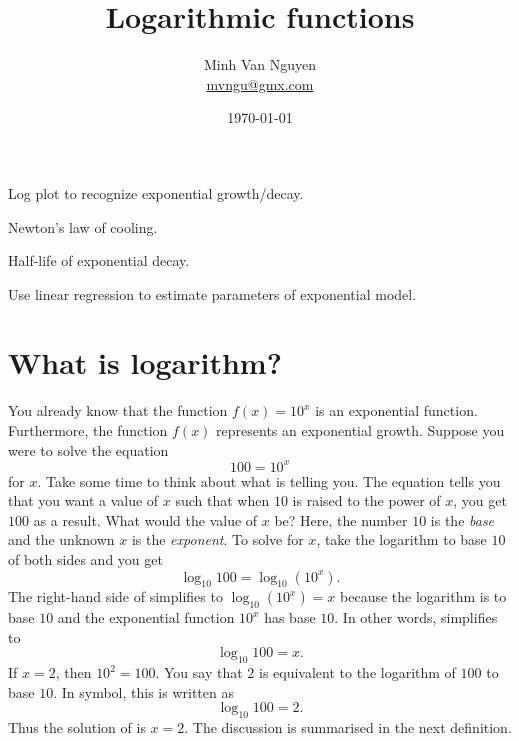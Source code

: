 \documentclass[a4paper,oneside,12pt]{article}
\begin{document}
\title{\Large\bf Logarithmic functions}
\author{%
  Minh Van Nguyen \\
  \url{mvngu@gmx.com}
}
\date{\today}
\maketitle

{\color{red}
\begin{packeditem}
\item Log plot to recognize exponential growth/decay.

\item Newton's law of cooling.

\item Half-life of exponential decay.

\item Use linear regression to estimate parameters of exponential
  model.
\end{packeditem}
}



\section{What is logarithm?}

You already know that the function $f(x) = 10^x$ is an exponential
function.  Furthermore, the function $f(x)$ represents an exponential
growth.  Suppose you were to solve the equation
\begin{equation}
\label{eqn:exponential_growth_100_10_x}
100
=
10^x
\end{equation}
for $x$.  Take some time to think about what
 is telling you.  The
equation tells you that you want a value of $x$ such that when $10$ is
raised to the power of $x$, you get $100$ as a result.  What would the
value of $x$ be?  Here, the number $10$ is the \emph{base} and the
unknown $x$ is the \emph{exponent}.  To solve
 for $x$, take the logarithm
to base $10$ of both sides and you get
\begin{equation}
\label{eqn:log10_100}
\log_{10} 100
=
\log_{10} (10^x).
\end{equation}
The right-hand side of  simplifies to
$\log_{10} (10^x) = x$ because the logarithm is to base $10$ and the
exponential function $10^x$ has base $10$.  In other words,
 simplifies to
\[
\log_{10} 100
=
x.
\]
If $x = 2$, then $10^2 = 100$.  You say that $2$ is equivalent to the
logarithm of $100$ to base $10$.  In symbol, this is written as
\[
\log_{10}100
=
2.
\]
Thus the solution of  is
$x = 2$.  The discussion is summarised in the next definition.
\end{document}
